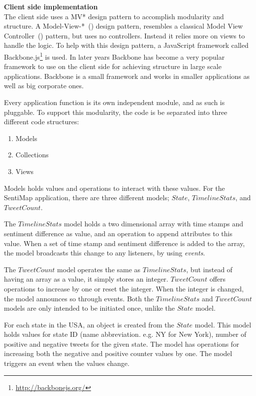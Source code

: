 \textbf{Client side implementation} \\

The client side uses a MV* design pattern to accomplish modularity and structure. A Model-View-*~() design pattern, resembles a classical Model View Controller~() pattern, but uses no controllers. Instead it relies more on views to handle the logic. To help with this design pattern, a JavaScript framework called Backbone.js\footnote{\url{http://backbonejs.org/}} is used. In later years Backbone has become a very popular framework to use on the client side for achieving structure in large scale applications. Backbone is a small framework and works in smaller applications as well as big corporate ones.

Every application function is its own independent module, and as such is pluggable. To support this modularity, the code is be separated into three different code structures:

\begin{enumerate}
\item Models
\item Collections
\item Views
\end{enumerate}

Models holds values and operations to interact with these values. For the SentiMap application, there are three different models; $State$, $TimelineStats$, and $TweetCount$. 

The $TimelineStats$ model holds a two dimensional array with time stamps and sentiment difference as value, and an operation to append attributes to this value. When a set of time stamp and sentiment difference is added to the array, the model broadcasts this change to any listeners, by using \textit{events}. 

The $TweetCount$ model operates the same as $TimelineStats$, but instead of having an array as a value, it simply stores an integer. $TweetCount$ offers operations to increase by one or reset the integer. When the integer is changed, the model announces so through events. Both the $TimelineStats$ and $TweetCount$ models are only intended to be initiated once, unlike the $State$ model.

For each state in the USA, an object is created from the $State$ model. This model holds values for state ID (name abbreviation. e.g. NY for New York), number of positive and negative tweets for the given state. The model has operations for increasing both the negative and positive counter values by one. The model triggers an event when the values change. 

